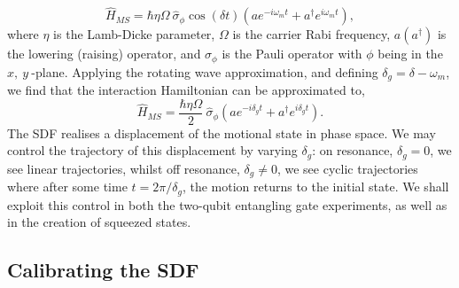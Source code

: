     \begin{equation}
        \hat{H}_{MS} = \hbar \eta\Omega~\hat{\sigma}_\phi\cos(\delta t) \left( a e^{-i\omega_{m} t} + a^\dagger e^{i\omega_{m} t} \right),
    \end{equation}
    where $\eta$ is the Lamb-Dicke parameter, $\Omega$ is the carrier Rabi
    frequency, $a(a^\dagger)$ is the lowering (raising) operator, and
    $\sigma_\phi$ is the Pauli operator with $\phi$ being in the $x,~y~$-plane.
    Applying the rotating wave approximation, and defining $\delta_g = \delta -
    \omega_{m}$, we find that the interaction Hamiltonian can be approximated
    to,
    \begin{equation}
        \hat{H}_{MS} = \frac{\hbar \eta\Omega}{2}~\hat{\sigma}_\phi \left( a e^{-i\delta_g t} + a^\dagger e^{i\delta_g t} \right).
    \end{equation}
    The SDF realises a displacement of the motional state in phase space. We may
    control the trajectory of this displacement by varying $\delta_g$: on
    resonance, $\delta_g = 0$, we see linear trajectories, whilst off resonance,
    $\delta_g \neq 0$, we see cyclic trajectories where after some time $t =
    2\pi/\delta_g$, the motion returns to the initial state. We shall exploit
    this control in both the two-qubit entangling gate experiments, as well as
    in the creation of squeezed states.\\

\subsection{Calibrating the SDF}

